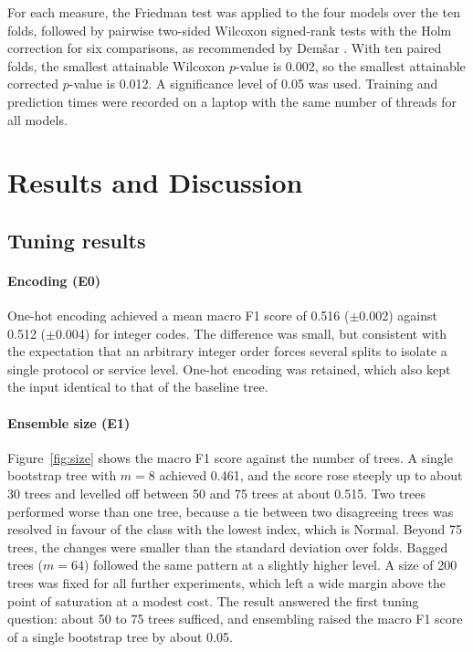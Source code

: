 \documentclass[conference,10pt]{IEEEtran}
\begin{document}
For each measure, the Friedman test \cite{friedman1937use} was applied to the four models over the ten folds, followed by pairwise two-sided Wilcoxon signed-rank tests \cite{wilcoxon1945individual} with the Holm correction \cite{holm1979simple} for six comparisons, as recommended by Dem\v{s}ar \cite{demsar2006statistical}. With ten paired folds, the smallest attainable Wilcoxon $p$-value is 0.002, so the smallest attainable corrected $p$-value is 0.012. A significance level of 0.05 was used. Training and prediction times were recorded on a laptop with the same number of threads for all models.

\section{Results and Discussion}\label{sec:results}

\subsection{Tuning results}\label{sec:res-tuning}

\paragraph*{Encoding (E0)} One-hot encoding achieved a mean macro F1 score of 0.516 ($\pm$0.002) against 0.512 ($\pm$0.004) for integer codes. The difference was small, but consistent with the expectation that an arbitrary integer order forces several splits to isolate a single protocol or service level. One-hot encoding was retained, which also kept the input identical to that of the baseline tree.

\paragraph*{Ensemble size (E1)} Figure~\ref{fig:size} shows the macro F1 score against the number of trees. A single bootstrap tree with $m=8$ achieved 0.461, and the score rose steeply up to about 30 trees and levelled off between 50 and 75 trees at about 0.515. Two trees performed worse than one tree, because a tie between two disagreeing trees was resolved in favour of the class with the lowest index, which is Normal. Beyond 75 trees, the changes were smaller than the standard deviation over folds. Bagged trees ($m=64$) followed the same pattern at a slightly higher level. A size of 200 trees was fixed for all further experiments, which left a wide margin above the point of saturation at a modest cost. The result answered the first tuning question: about 50 to 75 trees sufficed, and ensembling raised the macro F1 score of a single bootstrap tree by about 0.05.
\end{document}
